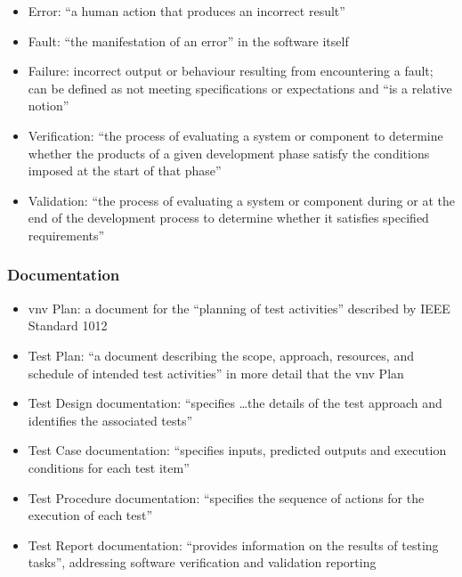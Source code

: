 \begin{itemize}
      \item Error: ``a human action that produces an incorrect result''
            \cite[p.~399]{van_vliet_software_2000}
      \item Fault: ``the manifestation of an error'' in the software itself
            \cite[p.~400]{van_vliet_software_2000}
      \item Failure: incorrect output or behaviour resulting from encountering
            a fault; can be defined as not meeting specifications or
            expectations and ``is a relative notion''
            \cite[p.~400]{van_vliet_software_2000}
      \item Verification: ``the process of evaluating a system or component
            to determine whether the products of a given development phase
            satisfy the conditions imposed at the start of that phase''
            \cite[p.~400]{van_vliet_software_2000}
      \item Validation: ``the process of evaluating a system or component
            during or at the end of the development process to determine
            whether it satisfies specified requirements''
            \cite[p.~400]{van_vliet_software_2000}
\end{itemize}

\subsubsection{Documentation}

\begin{itemize}
      \item \acf{vnv} Plan: a document for the ``planning of test activities''
            described by IEEE Standard 1012 \cite[p.~411]{van_vliet_software_2000}
      \item Test Plan: ``a document describing the scope, approach, resources,
            and schedule of intended test activities'' in more detail that the
            \acs{vnv} Plan \cite[p.~412-413]{van_vliet_software_2000}
      \item Test Design documentation: ``specifies \dots the details of the
            test approach and identifies the associated tests''
            \cite[p.~413]{van_vliet_software_2000}
      \item Test Case documentation: ``specifies inputs, predicted outputs and
            execution conditions for each test item''
            \cite[p.~413]{van_vliet_software_2000}
      \item Test Procedure documentation: ``specifies the sequence of actions
            for the execution of each test'' \cite[p.~413]{van_vliet_software_2000}
      \item Test Report documentation: ``provides information on the results of
            testing tasks'', addressing software verification and validation
            reporting \cite[p.~413]{van_vliet_software_2000}
\end{itemize}

